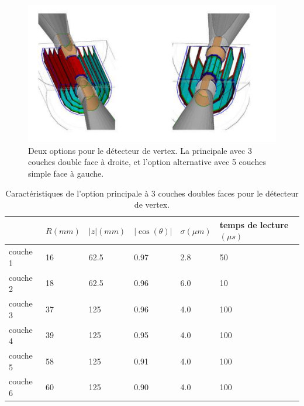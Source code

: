 
    \begin{figure}[!htb]
    \begin{center} 
      \includegraphics[scale=0.30]{./figures/options_VXD.png}
      \caption{Deux options pour le d\'etecteur de vertex. La principale avec 3 couches double face \`a droite, et l'option alternative avec 5 couches simple face \`a gauche.}
      \label{fig:optionsVXD}
    \end{center}
  \end{figure} 
  
  \begin{table}[h]
  \begin{center}
  \begin{tabular}{|l|l|l|l|l|l|} \hline
           & $R(mm)$ & $|z|(mm)$ & $|\cos(\theta)|$ & $\sigma(\mu m)$ & temps de lecture $(\mu s)$ \\ \hline \hline
  couche 1 &   16    &   62.5    &       0.97       &      2.8        &           50               \\
  couche 2 &   18    &   62.5    &       0.96       &      6.0        &           10               \\ \hline
  couche 3 &   37    &   125     &       0.96       &      4.0        &           100              \\
  couche 4 &   39    &   125     &       0.95       &      4.0        &           100              \\ \hline
  couche 5 &   58    &   125     &       0.91       &      4.0        &           100              \\
  couche 6 &   60    &   125     &       0.90       &      4.0        &           100              \\  \hline
  \end{tabular}
  \caption{Caract\'eristiques de l'option principale \`a 3 couches doubles faces pour le d\'etecteur de vertex.}
  \label{tab:caractVXD}
  \end{center}
  \end{table}
  
